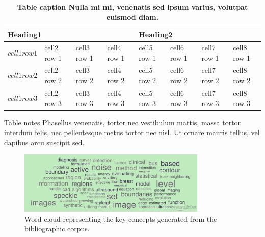 
\begin{table}[!ht]
\begin{adjustwidth}{-2.25in}{0in} %
\caption{
{\bf Table caption Nulla mi mi, venenatis sed ipsum varius, volutpat euismod diam.}}
\begin{tabular}{|l|l|l|l|l|l|l|l|}
\hline
\multicolumn{4}{|l|}{\bf Heading1} & \multicolumn{4}{|l|}{\bf Heading2}\\ \hline
$cell1 row1$ & cell2 row 1 & cell3 row 1 & cell4 row 1 & cell5 row 1 & cell6 row 1 & cell7 row 1 & cell8 row 1\\ \hline
$cell1 row2$ & cell2 row 2 & cell3 row 2 & cell4 row 2 & cell5 row 2 & cell6 row 2 & cell7 row 2 & cell8 row 2\\ \hline
$cell1 row3$ & cell2 row 3 & cell3 row 3 & cell4 row 3 & cell5 row 3 & cell6 row 3 & cell7 row 3 & cell8 row 3\\ \hline
\end{tabular}
\begin{flushleft} Table notes Phasellus venenatis, tortor nec vestibulum mattis, massa tortor interdum felis, nec pellentesque metus tortor nec nisl. Ut ornare mauris tellus, vel dapibus arcu suscipit sed.
\end{flushleft}
\label{table1}
\end{adjustwidth}
\end{table}

\begin{figure}[!ht]
  \centering
  \includegraphics[width=0.8\textwidth]{./content/analysis/figures/wcloud.png}
    \caption{Word cloud representing the key-concepts generated from the bibliographic corpus.}
  \label{fig:wcloud}
\end{figure}

